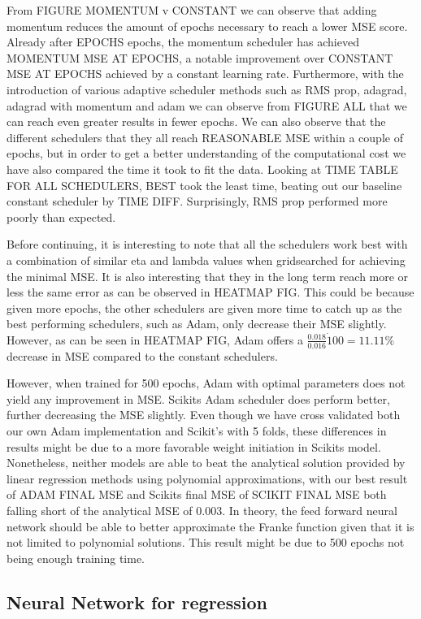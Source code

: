\documentclass[onecolumn,10pt,cleanfoot]{asme2ej}
\begin{document}
From FIGURE MOMENTUM v CONSTANT we can observe that adding momentum reduces the amount of epochs necessary to reach a lower MSE score. Already after EPOCHS epochs, the momentum scheduler has achieved MOMENTUM MSE AT EPOCHS, a notable improvement over CONSTANT MSE AT EPOCHS achieved by a constant learning rate. Furthermore, with the introduction of various adaptive scheduler methods such as RMS prop, adagrad, adagrad with momentum and adam we can observe from FIGURE ALL that we can reach even greater results in fewer epochs. We can also observe that the different schedulers that they all reach REASONABLE MSE within a couple of epochs, but in order to get a better understanding of the computational cost we have also compared the time it took to fit the data. Looking at TIME TABLE FOR ALL SCHEDULERS, BEST took the least time, beating out our baseline constant scheduler by TIME DIFF. Surprisingly, RMS prop performed more poorly than expected.

Before continuing, it is interesting to note that all the schedulers work best with a combination of similar eta and lambda values when gridsearched for achieving the minimal MSE. It is also interesting that they in the long term reach more or less the same error as can be observed in HEATMAP FIG. This could be because given more epochs, the other schedulers are given more time to catch up as the best performing schedulers, such as Adam, only decrease their MSE slightly. However, as can be seen in HEATMAP FIG, Adam offers a $\frac{0.018}{0.016} \dot 100 = 11.11\%$ decrease in MSE compared to the constant schedulers.

However, when trained for 500 epochs, Adam with optimal parameters does not yield any improvement in MSE. Scikits Adam scheduler does perform better, further decreasing the MSE slightly. Even though we have cross validated both our own Adam implementation and Scikit's with 5 folds, these differences in results might be due to a more favorable weight initiation in Scikits model. Nonetheless, neither models are able to beat the analytical solution provided by linear regression methods using polynomial approximations, with our best result of ADAM FINAL MSE and Scikits final MSE of SCIKIT FINAL MSE both falling short of the analytical MSE of 0.003. In theory, the feed forward neural network should be able to better approximate the Franke function given that it is not limited to polynomial solutions. This result might be due to 500 epochs not being enough training time.

\subsection{Neural Network for regression}
\end{document}
